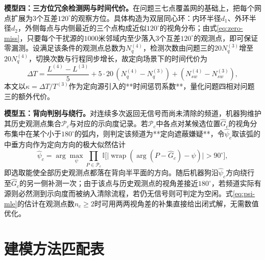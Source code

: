 \documentclass[12pt,a4paper]{ctexart}
\begin{document}
\textbf{模型四：三方位冗余检测网与时间代价。}在问题三七点覆盖网的基础上，把每个网点扩展为$3$个互差$120^\circ$的观察方位。具体构造为双层同心环：内环半径$d_1$、外环半径$d_2$，外侧每点与内侧最近的三个点构成近似$120^\circ$的视角分布；由式\eqref{eq:zero-miss}，只要每个干扰源的$1000$米邻域内至少落入$3$个互差$120^\circ$的观测点，即可保证零漏测。设满足该条件的观测点总数为$N_q^{(4)}$，检测次数由问题三的$20N_q^{(3)}$增至$20N_q^{(4)}$，切换次数与行程同步增长，故定向场景下的时间代价为
\begin{equation}
\Delta T=\frac{L^{(4)}-L^{(3)}}{5}+5\cdot20\,(N_q^{(4)}-N_q^{(3)})+(N_{sw}^{(4)}-N_{sw}^{(3)}),
\label{eq:penalty}
\end{equation}
本文以$\kappa=\Delta T/T^{(3)}$作为定向源引入的**时间惩罚系数**，量化问题四相对问题三的额外代价。

\textbf{模型五：背向判别与绕行。}对连续多次返回无信号而尚未清除的频道，机器狗维护其历史观测点集合$\mathcal{P}_c$与对应的示向度记录。若$\mathcal{P}_c$中各点对某候选位置$\hat G_c$的视角分布集中在某个小于$180^\circ$的弧内，则判定该频道为**定向遮蔽嫌疑**，令$\hat\psi_c$取该弧的中垂方向作为定向方向的极大似然估计
\begin{equation}
\hat\psi_c=\arg\max_{\psi}\prod_{P\in\mathcal{P}_c}\mathbb{I}\bigl[\lvert\operatorname{wrap}(\arg(P-\hat G_c)-\psi)\rvert>90^\circ\bigr],
\label{eq:psi-mle}
\end{equation}
即选取能使全部历史观测点都落在背向半平面的方向。随后机器狗沿$\hat\psi_c$方向绕行至$\hat G_c$的另一侧补测一次；由于该点与历史观测点的视角差接近$180^\circ$，若频道实际有源则必然测到示向度而被纳入清除流程，若仍无信号则可判定为空闲。式\eqref{eq:psi-mle}的估计在观测点数$n_c\ge2$时可用两两视角差的补集直接给出闭式解，无需数值优化。

\section{建模方法匹配表}
\end{document}
